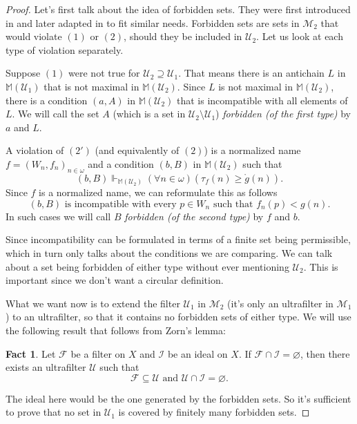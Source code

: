 \documentclass[12pt]{article}\usepackage[english]{babel}
\newcommand{\M}{\mathbb{M}}
\newcommand{\calM}{\mathcal{M}}
\newcommand{\calF}{\mathcal{F}}
\newcommand{\calI}{\mathcal{I}}
\newcommand{\calU}{\mathcal{U}}
\theoremstyle{definition}
\newtheorem*{fact}{Fact}
\theoremstyle{remark}
\begin{document}
\begin{proof}
  Let's first talk about the idea of forbidden sets.
  They were first introduced in \cite{BlassShelah1989} and later adapted in \cite{BrendleFischer2011} to fit similar needs.
  Forbidden sets are sets in $\calM_2$ that would violate $(1)$ or $(2)$, should they be included in $\calU_2$.
  Let us look at each type of violation separately.
  
  Suppose $(1)$ were not true for $\calU_2 \supseteq \calU_1$.
  That means there is an antichain $L$ in $\M(\calU_1)$ that is not maximal in $\M(\calU_2)$.
  Since $L$ is not maximal in $\M(\calU_2)$, there is a condition $(a, A)$ in $\M(\calU_2)$ that is incompatible with all elements of $L$.
  We will call the set $A$ (which is a set in $\calU_2 \setminus \calU_1$) \textit{forbidden (of the first type)} by $a$ and $L$.
  
  A violation of $(2')$ (and equivalently of $(2)$) is a normalized name $f = (W_n, f_n)_{n \in \omega}$ and a condition $(b, B)$ in $\M(\calU_2)$ such that
  \[
    (b, B) \Vdash_{\M(\calU_2)} (\forall n \in \omega) (\tau_f(n) \geq \mathring{g}(n)).
  \]
  Since $f$ is a normalized name, we can reformulate this as follows
  \[
    (b, B) \text{ is incompatible with every } p \in W_n \text{ such that } f_n(p) < g(n).
  \]
  In such cases we will call $B$ \textit{forbidden (of the second type)} by $f$ and $b$.

  Since incompatibility can be formulated in terms of a finite set being permissible, which in turn only talks about the conditions we are comparing.
  We can talk about a set being forbidden of either type without ever mentioning $\calU_2$.
  This is important since we don't want a circular definition.

  What we want now is to extend the filter $\calU_1$ in $\calM_2$ (it's only an ultrafilter in $\calM_1$) to an ultrafilter, so that it contains no forbidden sets of either type.
  We will use the following result that follows from Zorn's lemma:
  \begin{fact}
    Let $\calF$ be a filter on $X$ and $\calI$ be an ideal on $X$.
    If $\calF \cap \calI = \varnothing$, then there exists an ultrafilter $\calU$ such that
    \[
      \calF \subseteq \calU \text{ and } \calU \cap \calI = \varnothing.
    \]
  \end{fact}
  The ideal here would be the one generated by the forbidden sets.
  So it's sufficient to prove that no set in $\calU_1$ is covered by finitely many forbidden sets.
  

\end{proof}
\end{document}
